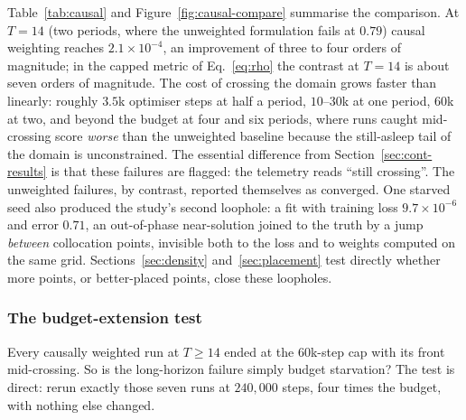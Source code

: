 \documentclass[11pt,a4paper]{article}
\begin{document}
Table~\ref{tab:causal} and Figure~\ref{fig:causal-compare} summarise the
comparison. At $T = 14$ (two periods, where the unweighted formulation
fails at $0.79$) causal weighting reaches $2.1\times10^{-4}$, an
improvement of three to four orders of magnitude; in the capped metric of
Eq.~\eqref{eq:rho} the contrast at $T=14$ is about seven orders of
magnitude. The cost of crossing the domain grows faster than linearly:
roughly $3.5$k optimiser steps at half a period, $10$--$30$k at one
period, $60$k at two, and beyond the budget at four and six periods,
where runs caught mid-crossing score \emph{worse} than the unweighted
baseline because the still-asleep tail of the domain is unconstrained.
The essential difference from Section~\ref{sec:cont-results} is that
these failures are flagged: the telemetry reads ``still crossing''. The
unweighted failures, by contrast, reported themselves as converged. One
starved seed also produced the study's second loophole: a fit with
training loss $9.7\times10^{-6}$ and error $0.71$, an out-of-phase
near-solution joined to the truth by a jump \emph{between} collocation
points, invisible both to the loss and to weights computed on the same
grid. Sections~\ref{sec:density} and~\ref{sec:placement} test directly
whether more points, or better-placed points, close these loopholes.

\subsubsection{The budget-extension test}

Every causally weighted run at $T \ge 14$ ended at the $60$k-step cap with
its front mid-crossing. So is the long-horizon failure simply budget
starvation? The test is direct: rerun exactly those seven runs at
$240{,}000$ steps, four times the budget, with nothing else changed.
\end{document}
